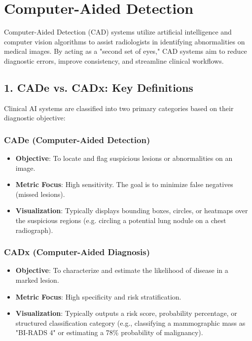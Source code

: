 \chapter{Computer-Aided Detection}

\label{ch:computer_aided_detection}

Computer-Aided Detection (CAD) systems utilize artificial intelligence and computer vision algorithms to assist radiologists in identifying abnormalities on medical images. By acting as a "second set of eyes," CAD systems aim to reduce diagnostic errors, improve consistency, and streamline clinical workflows.


\section*{1. CADe vs. CADx: Key Definitions}
Clinical AI systems are classified into two primary categories based on their diagnostic objective:

\subsection*{CADe (Computer-Aided Detection)}
\begin{itemize}
    \item \textbf{Objective}: To locate and flag suspicious lesions or abnormalities on an image.
    \item \textbf{Metric Focus}: High sensitivity. The goal is to minimize false negatives (missed lesions).
    \item \textbf{Visualization}: Typically displays bounding boxes, circles, or heatmaps over the suspicious regions (e.g. circling a potential lung nodule on a chest radiograph).
\end{itemize}

\subsection*{CADx (Computer-Aided Diagnosis)}
\begin{itemize}
    \item \textbf{Objective}: To characterize and estimate the likelihood of disease in a marked lesion.
    \item \textbf{Metric Focus}: High specificity and risk stratification.
    \item \textbf{Visualization}: Typically outputs a risk score, probability percentage, or structured classification category (e.g., classifying a mammographic mass as "BI-RADS 4" or estimating a 78\% probability of malignancy).
\end{itemize}


